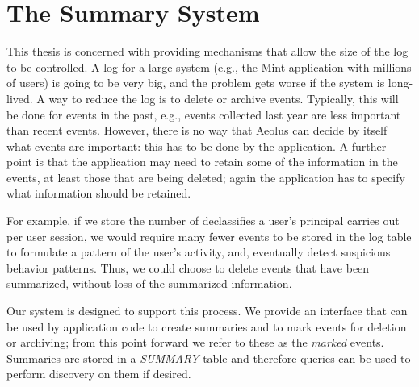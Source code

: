 \chapter{The Summary System}

This thesis is concerned with providing mechanisms that allow the size of the log to be controlled. A log for a large system (e.g., the Mint application with millions of users) is going to be very big, and the problem gets worse if the system is long-lived. A way to reduce the log is to delete or archive events. Typically, this will be done for events in the past, e.g., events collected last year are less important than recent events. However, there is no way that Aeolus can decide by itself what events are important: this has to be done by the application. A further point is that the application may need to retain some of the information in the events, at least those that are being deleted; again the application has to specify what information should be retained.

For example, if we store the number of declassifies a user's principal carries out per user session, we would require many fewer events to be stored in the log table to formulate a pattern of the user's activity, and, eventually detect suspicious behavior patterns. Thus, we could choose to delete events that have been summarized, without loss of the summarized information.

Our system is designed to support this process. We provide an interface that can be used by application code to create summaries and to mark events for deletion or archiving; from this point forward we refer to these as the \emph{marked} events. Summaries are stored in a \emph{SUMMARY} table and therefore queries can be used to perform discovery on them if desired.



